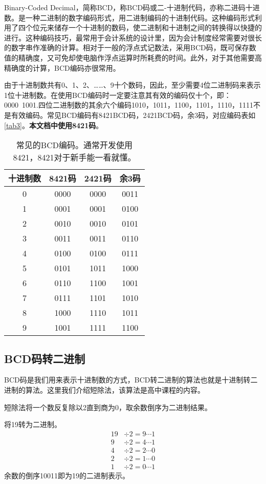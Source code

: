 Binary-Coded Decimal，简称BCD，称BCD码或二-十进制代码，亦称二进码十进数。是一种二进制的数字编码形式，用二进制编码的十进制代码。这种编码形式利用了四个位元来储存一个十进制的数码，使二进制和十进制之间的转换得以快捷的进行。这种编码技巧，最常用于会计系统的设计里，因为会计制度经常需要对很长的数字串作准确的计算。相对于一般的浮点式记数法，采用BCD码，既可保存数值的精确度，又可免却使电脑作浮点运算时所耗费的时间。此外，对于其他需要高精确度的计算，BCD编码亦很常用。

由于十进制数共有0、1、2、……、9十个数码，因此，至少需要4位二进制码来表示1位十进制数。在使用BCD编码时一定要注意其有效的编码仅十个，即：0000~1001.四位二进制数的其余六个编码1010，1011，1100，1101，1110，1111不是有效编码。常见BCD编码有8421BCD码，2421BCD码，余3码，对应编码表如\autoref{tab3}。\textbf{本文档中使用8421码}。
\begin{table}[!ht]
\centering
\begin{tabular}{|c|c|c|c|}
\hline
十进制数&8421码&2421码&余3码\\\hline
0&0000&0000&0011\\\hline
1&0001&0001&0100\\\hline
2&0010&0010&0101\\\hline
3&0011&0011&0110\\\hline
4&0100&0100&0111\\\hline
5&0101&1011&1000\\\hline
6&0110&1100&1001\\\hline
7&0111&1101&1010\\\hline
8&1000&1110&1011\\\hline
9&1001&1111&1100\\\hline
\end{tabular}
\caption{常见的BCD编码。通常开发使用8421，8421对于新手能一看就懂。}\label{tab3}
\end{table}

\subsection{BCD码转二进制}\label{sec30}
BCD码是我们用来表示十进制数的方式，BCD转二进制的算法也就是十进制转二进制的算法。这里我们介绍短除法，该算法是高中课程的内容。

短除法将一个数反复除以2直到商为0，取余数倒序为二进制结果。
\begin{example}
将19转为二进制。
\begin{align*}
19&\div2=9\cdots1\\
9&\div2=4\cdots1\\
4&\div2=2\cdots0\\
2&\div2=1\cdots0\\
1&\div2=0\cdots1
\end{align*}
余数的倒序10011即为19的二进制表示。
\end{example}

